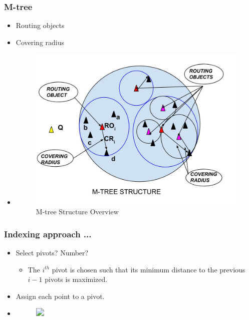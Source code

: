 \documentclass{beamer}
\begin{document}
\begin{frame}
\frametitle{M-tree}
\begin{overlayarea}{\textwidth}{.8\textheight}

\begin{itemize}
	\item<1-> Routing objects 
	\item<1-> Covering radius
	
\item<2->[]
\begin{figure}[ht]	
\centering
\includegraphics[width=0.55 \columnwidth]{img/mtree.jpg}
\caption{M-tree Structure Overview}
\end{figure}
	
\end{itemize}
\end{overlayarea}
\end{frame}

\begin{frame}
\frametitle{Indexing approach ...}
\begin{overlayarea}{\textwidth}{.8\textheight}
\begin{itemize}
	\item<1-> Select pivots? Number?
	\begin{itemize}
	\item<2-> The $i^{th}$ pivot is chosen such that its minimum distance to the previous $i-1$ pivots is maximized.
	\end{itemize}
	\item<3-> Assign each point to a pivot.
	\item<4->[]	
\begin{figure}[ht]	
\centering
\includegraphics<3->[width=0.5 \columnwidth]{img/image0a.jpg}
\end{figure}

\end{itemize}
\end{overlayarea}	
\end{frame}
\end{document}
